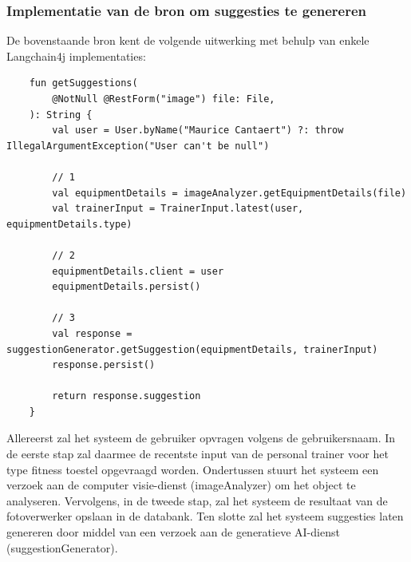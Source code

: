 \subsubsection{Implementatie van de bron om suggesties te genereren}
\label{subsubsec:implementatie-bron-suggesties-genereren}
De bovenstaande bron kent de volgende uitwerking met behulp van enkele Langchain4j implementaties:
\begin{listing}[H]
    \begin{verbatim}
    fun getSuggestions(
        @NotNull @RestForm("image") file: File,
    ): String {
        val user = User.byName("Maurice Cantaert") ?: throw IllegalArgumentException("User can't be null")

        // 1
        val equipmentDetails = imageAnalyzer.getEquipmentDetails(file)
        val trainerInput = TrainerInput.latest(user, equipmentDetails.type)

        // 2
        equipmentDetails.client = user
        equipmentDetails.persist()

        // 3
        val response = suggestionGenerator.getSuggestion(equipmentDetails, trainerInput)
        response.persist()

        return response.suggestion
    }
    \end{verbatim}
\end{listing}
\label{code:user-resource}
Allereerst zal het systeem de gebruiker opvragen volgens de gebruikersnaam.
In de eerste stap zal daarmee de recentste input van de personal trainer voor het type fitness toestel opgevraagd worden.
Ondertussen stuurt het systeem een verzoek aan de computer visie-dienst (imageAnalyzer) om het object te analyseren.
Vervolgens, in de tweede stap, zal het systeem de resultaat van de fotoverwerker opslaan in de databank.
Ten slotte zal het systeem suggesties laten genereren door middel van een verzoek aan de generatieve AI-dienst (suggestionGenerator).

